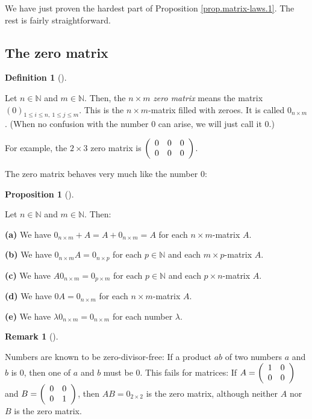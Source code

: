 \documentclass[numbers=enddot,12pt,final,onecolumn,notitlepage]{scrartcl}%
\theoremstyle{definition}
\newtheorem{prop}[theo]{Proposition}
\newenvironment{proposition}[1][]
{\begin{prop}[#1]\begin{leftbar}}
{\end{leftbar}\end{prop}}
\newtheorem{defi}[theo]{Definition}
\newenvironment{definition}[1][]
{\begin{defi}[#1]\begin{leftbar}}
{\end{leftbar}\end{defi}}
\newtheorem{remk}[theo]{Remark}
\newenvironment{remark}[1][]
{\begin{remk}[#1]\begin{leftbar}}
{\end{leftbar}\end{remk}}
\begin{document}
We have just proven the hardest part of Proposition \ref{prop.matrix-laws.1}.
The rest is fairly straightforward.

\subsection{The zero matrix}

\begin{definition}
Let $n\in\mathbb{N}$ and $m\in\mathbb{N}$. Then, the $n\times m$\textit{ zero
matrix} means the matrix $\left(  0\right)  _{1\leq i\leq n,\ 1\leq j\leq m}$.
This is the $n\times m$-matrix filled with zeroes. It is called $0_{n\times
m}$. (When no confusion with the number $0$ can arise, we will just call it
$0$.)
\end{definition}

For example, the $2\times3$ zero matrix is $\left(
\begin{array}
[c]{ccc}%
0 & 0 & 0\\
0 & 0 & 0
\end{array}
\right)  $.

The zero matrix behaves very much like the number $0$:

\begin{proposition}
\label{prop.matrix-laws.0}Let $n\in\mathbb{N}$ and $m\in\mathbb{N}$. Then:

\textbf{(a)} We have $0_{n\times m}+A=A+0_{n\times m}=A$ for each $n\times
m$-matrix $A$.

\textbf{(b)} We have $0_{n\times m}A=0_{n\times p}$ for each $p\in\mathbb{N}$
and each $m\times p$-matrix $A$.

\textbf{(c)} We have $A0_{n\times m}=0_{p\times m}$ for each $p\in\mathbb{N}$
and each $p\times n$-matrix $A$.

\textbf{(d)} We have $0A=0_{n\times m}$ for each $n\times m$-matrix $A$.

\textbf{(e)} We have $\lambda0_{n\times m}=0_{n\times m}$ for each number
$\lambda$.
\end{proposition}

\begin{remark}
Numbers are known to be zero-divisor-free: If a product $ab$ of two numbers
$a$ and $b$ is $0$, then one of $a$ and $b$ must be $0$. This fails for
matrices: If $A=\left(
\begin{array}
[c]{cc}%
1 & 0\\
0 & 0
\end{array}
\right)  $ and $B=\left(
\begin{array}
[c]{cc}%
0 & 0\\
0 & 1
\end{array}
\right)  $, then $AB=0_{2\times2}$ is the zero matrix, although neither $A$
nor $B$ is the zero matrix.
\end{remark}
\end{document}
